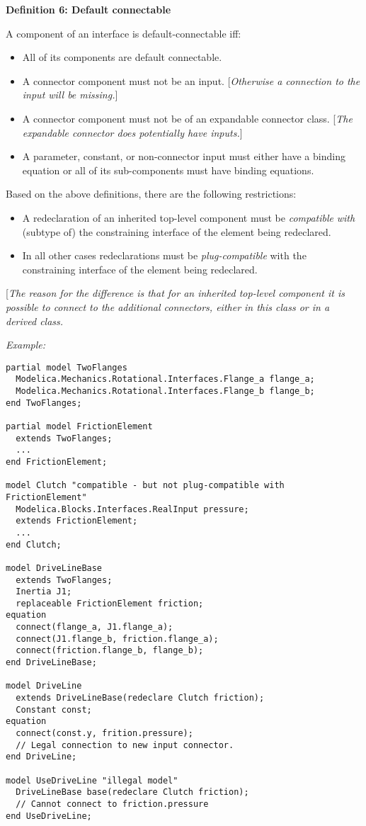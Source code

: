 \documentclass[../MLS.tex]{subfiles}
\begin{document}
\textbf{Definition 6: Default connectable}

A component of an interface is default-connectable iff:

\begin{itemize}
\item
  All of its components are default connectable.
\item
  A connector component must not be an input. {[}\emph{Otherwise a
  connection to the input will be missing.}{]}
\item
  A connector component must not be of an expandable connector class.
  {[}\emph{The expandable connector does potentially have inputs.}{]}
\item
  A parameter, constant, or non-connector input must either have a
  binding equation or all of its sub-components must have binding
  equations.
\end{itemize}

Based on the above definitions, there are the following restrictions:

\begin{itemize}
\item
  A redeclaration of an inherited top-level component must be
  \emph{compatible} \emph{with} (subtype of) the constraining interface
  of the element being redeclared.
\item
  In all other cases redeclarations must be \emph{plug-compatible} with
  the constraining interface of the element being redeclared.
\end{itemize}

{[}\emph{The reason for the difference is that for an inherited
top-level component it is possible to connect to the additional
connectors, either in this class or in a derived class.}

\emph{Example:}
\begin{lstlisting}[language=modelica]
partial model TwoFlanges
  Modelica.Mechanics.Rotational.Interfaces.Flange_a flange_a;
  Modelica.Mechanics.Rotational.Interfaces.Flange_b flange_b;
end TwoFlanges;

partial model FrictionElement
  extends TwoFlanges;
  ...
end FrictionElement;

model Clutch "compatible - but not plug-compatible with FrictionElement"
  Modelica.Blocks.Interfaces.RealInput pressure;
  extends FrictionElement;
  ...
end Clutch;

model DriveLineBase
  extends TwoFlanges;
  Inertia J1;
  replaceable FrictionElement friction;
equation
  connect(flange_a, J1.flange_a);
  connect(J1.flange_b, friction.flange_a);
  connect(friction.flange_b, flange_b);
end DriveLineBase;

model DriveLine
  extends DriveLineBase(redeclare Clutch friction);
  Constant const;
equation
  connect(const.y, frition.pressure);
  // Legal connection to new input connector.
end DriveLine;

model UseDriveLine "illegal model"
  DriveLineBase base(redeclare Clutch friction);
  // Cannot connect to friction.pressure
end UseDriveLine;
\end{lstlisting}
\end{document}
